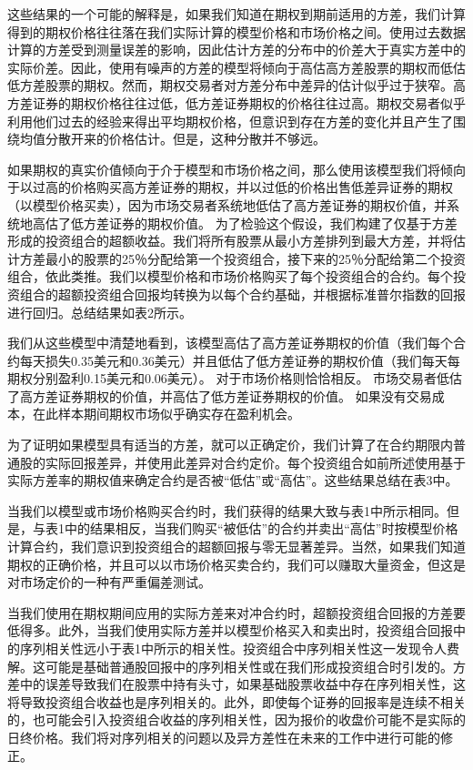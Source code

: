 \par{这些结果的一个可能的解释是，如果我们知道在期权到期前适用的方差，我们计算得到的期权价格往往落在我们实际计算的模型价格和市场价格之间。使用过去数据计算的方差受到测量误差的影响，因此估计方差的分布中的价差大于真实方差中的实际价差。因此，使用有噪声的方差的模型将倾向于高估高方差股票的期权而低估低方差股票的期权。然而，期权交易者对方差分布中差异的估计似乎过于狭窄。高方差证券的期权价格往往过低，低方差证券期权的价格往往过高。期权交易者似乎利用他们过去的经验来得出平均期权价格，但意识到存在方差的变化并且产生了围绕均值分散开来的价格估计。但是，这种分散并不够远。}
\par{
    如果期权的真实价值倾向于介于模型和市场价格之间，那么使用该模型我们将倾向于以过高的价格购买高方差证券的期权，并以过低的价格出售低差异证券的期权（以模型价格买卖），因为市场交易者系统地低估了高方差证券的期权价值，并系统地高估了低方差证券的期权价值。 为了检验这个假设，我们构建了仅基于方差形成的投资组合的超额收益。我们将所有股票从最小方差排列到最大方差，并将估计方差最小的股票的25％分配给第一个投资组合，接下来的25％分配给第二个投资组合，依此类推。我们以模型价格和市场价格购买了每个投资组合的合约。每个投资组合的超额投资组合回报均转换为以每个合约基础，并根据标准普尔指数的回报进行回归。总结结果如表2所示。
}
\par{
    我们从这些模型中清楚地看到，该模型高估了高方差证券期权的价值（我们每个合约每天损失0.35美元和0.36美元）并且低估了低方差证券的期权价值（我们每天每期权分别盈利0.15美元和0.06美元）。 对于市场价格则恰恰相反。 市场交易者低估了高方差证券期权的价值，并高估了低方差证券期权的价值。 如果没有交易成本，在此样本期间期权市场似乎确实存在盈利机会。
}
\par{为了证明如果模型具有适当的方差，就可以正确定价，我们计算了在合约期限内普通股的实际回报差异，并使用此差异对合约定价。每个投资组合如前所述使用基于实际方差率的期权值来确定合约是否被“低估”或“高估”。这些结果总结在表3中。}
\par{
当我们以模型或市场价格购买合约时，我们获得的结果大致与表1中所示相同。但是，与表1中的结果相反，当我们购买“被低估”的合约并卖出“高估”时按模型价格计算合约，我们意识到投资组合的超额回报与零无显著差异。当然，如果我们知道期权的正确价格，并且可以以市场价格买卖合约，我们可以赚取大量资金，但这是对市场定价的一种有严重偏差测试。}
\par{
    当我们使用在期权期间应用的实际方差来对冲合约时，超额投资组合回报的方差要低得多。此外，当我们使用实际方差并以模型价格买入和卖出时，投资组合回报中的序列相关性远小于表1中所示的相关性。投资组合中序列相关性这一发现令人费解。这可能是基础普通股回报中的序列相关性或在我们形成投资组合时引发的。方差中的误差导致我们在股票中持有头寸，如果基础股票收益中存在序列相关性，这将导致投资组合收益也是序列相关的。此外，即使每个证券的回报率是连续不相关的，也可能会引入投资组合收益的序列相关性，因为报价的收盘价可能不是实际的日终价格。我们将对序列相关的问题以及异方差性在未来的工作中进行可能的修正。

}

